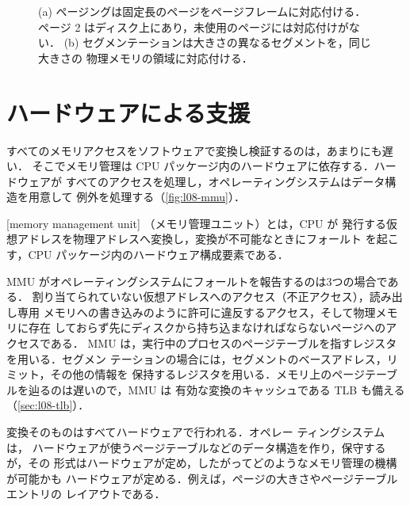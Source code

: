 \documentclass[../main.tex]{subfiles}
\begin{document}
\begin{figure}[htbp]
  \centering
  
  \caption{(a) ページングは固定長のページをページフレームに対応付ける．
    ページ 2 はディスク上にあり，未使用のページには対応付けがない．
    (b) セグメンテーションは大きさの異なるセグメントを，同じ大きさの
    物理メモリの領域に対応付ける．}
  \label{fig:l08-goals}
\end{figure}

\section{ハードウェアによる支援}
\label{sec:l08-hardware}

すべてのメモリアクセスをソフトウェアで変換し検証するのは，あまりにも遅い．
そこでメモリ管理は CPU パッケージ内のハードウェアに依存する．ハードウェアが
すべてのアクセスを処理し，オペレーティングシステムはデータ構造を用意して
例外を処理する（\cref{fig:l08-mmu}）．

\begin{definition}[メモリ管理ユニット]
  [memory management unit]%
  （メモリ管理ユニット）とは，CPU が
  発行する仮想アドレスを物理アドレスへ変換し，変換が不可能なときにフォールト
  を起こす，CPU パッケージ内のハードウェア構成要素である．
\end{definition}

MMU がオペレーティングシステムにフォールトを報告するのは3つの場合である．
割り当てられていない仮想アドレスへのアクセス（不正アクセス），読み出し専用
メモリへの書き込みのように許可に違反するアクセス，そして物理メモリに存在
しておらず先にディスクから持ち込まなければならないページへのアクセスである．
MMU は，実行中のプロセスのページテーブルを指すレジスタを用いる．セグメン
テーションの場合には，セグメントのベースアドレス，リミット，その他の情報を
保持するレジスタを用いる．メモリ上のページテーブルを辿るのは遅いので，MMU は
有効な変換のキャッシュである TLB も備える（\cref{sec:l08-tlb}）．

変換そのものはすべてハードウェアで行われる．オペレー
ティングシステムは，
ハードウェアが使うページテーブルなどのデータ構造を作り，保守するが，その
形式はハードウェアが定め，したがってどのようなメモリ管理の機構が可能かも
ハードウェアが定める．例えば，ページの大きさやページテーブルエントリの
レイアウトである．
\end{document}
